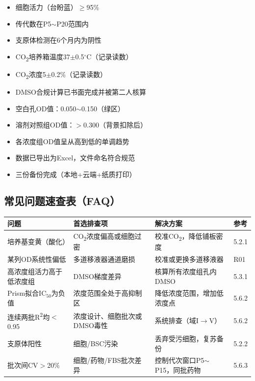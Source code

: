 \documentclass[12pt,a4paper]{article}
\newcommand{\ic}{\ensuremath{\text{IC}_{50}}}
\newcommand{\degC}{$^\circ$C}
\begin{document}
\begin{checklistbox}[title={实验开始前（Day 0）核查项}]
\begin{itemize}
\item[$\square$] 细胞活力（台盼蓝）$\geq$95\%
\item[$\square$] 传代数在P5$\sim$P20范围内
\item[$\square$] 支原体检测在6个月内为阴性
\item[$\square$] CO\textsubscript{2}培养箱温度37$\pm$0.5\degC{}（记录读数）
\item[$\square$] CO\textsubscript{2}浓度5$\pm$0.2\%（记录读数）
\item[$\square$] DMSO合规计算已书面完成并被第二人核算
\end{itemize}
\end{checklistbox}

\begin{checklistbox}[title={CCK-8检测后（Day 3/4/5）核查项}]
\begin{itemize}
\item[$\square$] 空白孔OD值：0.050$\sim$0.150（绿区）
\item[$\square$] 溶剂对照组OD值：$>$0.300（背景扣除后）
\item[$\square$] 各浓度组OD值呈从高到低的单调趋势
\item[$\square$] 数据已导出为Excel，文件命名符合规范
\item[$\square$] 三份备份完成（本地+云端+纸质打印）
\end{itemize}
\end{checklistbox}

\subsection{常见问题速查表（FAQ）}

\begin{center}
\begin{tabularx}{\textwidth}{lXXl}
\toprule
\rowcolor{tabheadbg}\color{white}\textbf{问题} & \color{white}\textbf{首选排查项} & \color{white}\textbf{解决方案} & \color{white}\textbf{参考} \\
\midrule
培养基变黄（酸化）& CO\textsubscript{2}浓度偏高或细胞过密 & 校准CO\textsubscript{2}，降低铺板密度 & 5.2.1 \\
某列OD系统性偏低 & 多道移液器通道磨损 & 校准或更换多道移液器 & R01 \\
高浓度组活力高于低浓度组 & DMSO梯度差异 & 核算所有浓度组孔内DMSO & 5.3.1 \\
Prism拟合\ic{}为负值 & 浓度范围全处于高抑制区 & 降低浓度范围，增加低浓度点 & 5.6.2 \\
连续两批R\textsuperscript{2}均$<$0.95 & 浓度设计、细胞批次或DMSO毒性 & 系统排查（域I$\to$V）& 5.6.2 \\
支原体阳性 & 细胞/BSC污染 & 丢弃受污细胞，复苏备份 & 5.2.2 \\
批次间CV$>$20\% & 细胞/药物/FBS批次差异 & 控制代次窗口P5$\sim$P15，同批药物 & 5.6.3 \\
\bottomrule
\end{tabularx}
\end{center}
\end{document}
